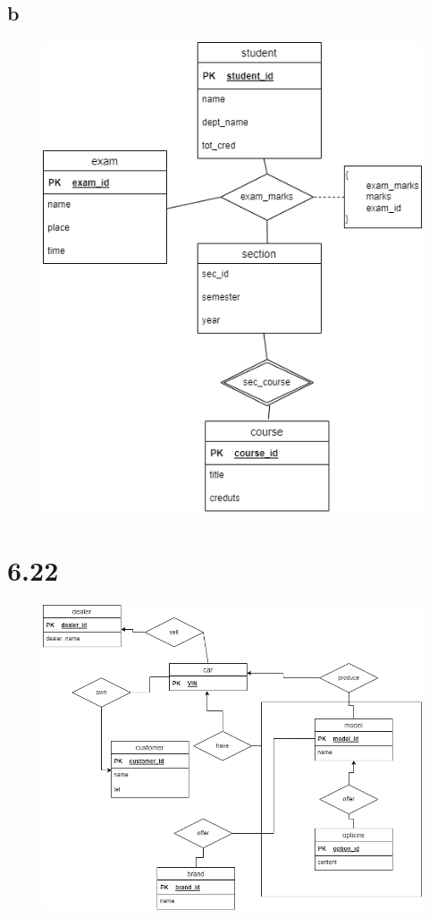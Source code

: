 \documentclass{article}
\begin{document}
    \subsection*{b}
    \begin{figure}[H]
        \centering
        \includegraphics[width=\textwidth]{img/53.png}
    \end{figure}
    \section*{6.22}
    \begin{figure}[H]
        \centering
        \includegraphics[width=\textwidth]{img/54.png}
    \end{figure}
\end{document}
